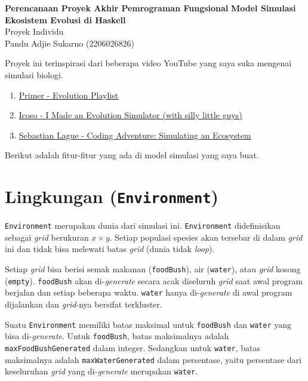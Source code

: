 \documentclass[12pt]{article}
\begin{document}
 
%
\renewcommand{\arraystretch}{1.25}

\begin{center}
    \Large
\textbf{Perencanaan Proyek Akhir Pemrograman Fungsional}
\textbf{Model Simulasi Ekosistem Evolusi di Haskell}\\
Proyek Individu\\
Pandu Adjie Sukarno (2206026826)
\end{center}
\noindent Proyek ini terinspirasi dari beberapa video YouTube yang saya suka mengenai simulasi biologi. 
\begin{enumerate}
    \item \href{https://youtube.com/playlist?list=PLKortajF2dPBWMIS6KF4RLtQiG6KQrTdB&si=hqaZhZ-h92zkJozj}{Primer - Evolution Playlist}
    \item \href{https://youtu.be/f7vH2Li9KOw?si=k78nDUqfp5TPhn00}{Icoso - I Made an Evolution Simulator (with silly little guys)}
    \item \href{https://youtu.be/r_It_X7v-1E?si=YXpYhTIrnf76xXY_}{Sebastian Lague - Coding Adventure: Simulating an Ecosystem}
\end{enumerate}
Berikut adalah fitur-fitur yang ada di model simulasi yang saya buat.
\section{Lingkungan (\texttt{Environment})}
\texttt{Environment} merupakan dunia dari simulasi ini. \texttt{Environment} didefinisikan sebagai \textit{grid} berukuran $x\times y$. Setiap populasi spesies akan tersebar di dalam \textit{grid} ini dan tidak bisa melewati batas \textit{grid} (dunia tidak \textit{loop}). 

\noindent Setiap \textit{grid} bisa berisi semak makanan (\texttt{foodBush}), air (\texttt{water}), atau \textit{grid} kosong (\texttt{empty}). \texttt{foodBush} akan di-\textit{generate} secara acak diseluruh \textit{grid} saat awal program berjalan dan setiap beberapa waktu. \texttt{water} hanya di-\textit{generate} di awal program dijalankan dan \textit{grid}-nya bersifat terkluster. 

\noindent Suatu \texttt{Environment} memiliki batas maksimal untuk \texttt{foodBush} dan \texttt{water} yang bisa di-\textit{generate}. Untuk \texttt{foodBush}, batas maksimalnya adalah \texttt{maxFoodBushGenerated} dalam integer. Sedangkan untuk \texttt{water}, batas maksimalnya adalah \texttt{maxWaterGenerated} dalam persentase, yaitu persentase dari keseluruhan \textit{grid} yang di-\textit{generate} merupakan \texttt{water}.
\end{document}
